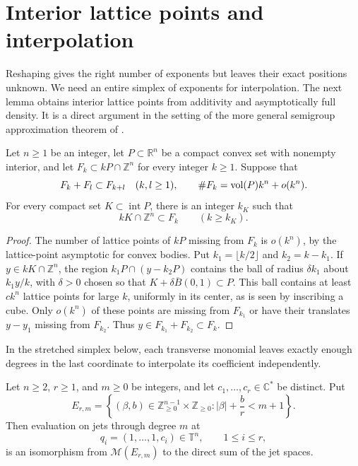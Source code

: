 \section{Interior lattice points and interpolation}
\label{sec:saturation}

Reshaping gives the right number of exponents but leaves their exact positions unknown. We need an entire simplex of exponents for interpolation. The next lemma obtains interior lattice points from additivity and asymptotically full density. It is a direct argument in the setting of the more general semigroup approximation theorem of \textcite[Theorem~1.6]{KK12}.

\begin{lemma}
\label{lem:interior-saturation}
Let $n\ge1$ be an integer, let $P\subset\mathbb{R}^n$ be a compact convex set with nonempty interior, and let $F_k\subset kP\cap\mathbb{Z}^n$ for every integer $k\ge1$. Suppose that
\[
 F_k+F_l\subset F_{k+l}\quad(k,l\ge1),
 \qquad
 \#F_k=\operatorname{vol}(P)k^n+o(k^n).
\]
For every compact set $K\subset\operatorname{int}P$, there is an integer $k_K$ such that
\[
 kK\cap\mathbb{Z}^n\subset F_k\qquad(k\ge k_K).
\]
\end{lemma}

\begin{proof}
The number of lattice points of $kP$ missing from $F_k$ is $o(k^n)$, by the lattice-point asymptotic for convex bodies. Put $k_1=\lfloor k/2\rfloor$ and $k_2=k-k_1$. If $y\in kK\cap\mathbb Z^n$, the region $k_1P\cap(y-k_2P)$ contains the ball of radius $\delta k_1$ about $k_1y/k$, with $\delta>0$ chosen so that $K+\delta\overline B(0,1)\subset P$. This ball contains at least $ck^n$ lattice points for large $k$, uniformly in its center, as is seen by inscribing a cube. Only $o(k^n)$ of these points are missing from $F_{k_1}$ or have their translates $y-y_1$ missing from $F_{k_2}$. Thus $y\in F_{k_1}+F_{k_2}\subset F_k$.
\end{proof}

In the stretched simplex below, each transverse monomial leaves exactly enough degrees in the last coordinate to interpolate its coefficient independently.

\begin{lemma}
\label{lem:simplex-interpolation}
Let $n\ge2$, $r\ge1$, and $m\ge0$ be integers, and let $c_1,\ldots,c_r\in\mathbb{C}^*$ be distinct. Put
\[
 E_{r,m}=
 \left\{(\beta,b)\in\mathbb{Z}_{\ge0}^{n-1}\times\mathbb{Z}_{\ge0}:
       |\beta|+\frac br<m+1\right\}.
\]
Then evaluation on jets through degree $m$ at
\[
 q_i=(1,\ldots,1,c_i)\in\mathbb{T}^n,\qquad 1\le i\le r,
\]
is an isomorphism from $\mathcal{M}(E_{r,m})$ to the direct sum of the jet spaces.
\end{lemma}


